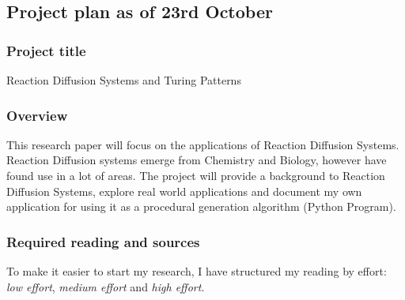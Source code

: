 \documentclass[a4paper, 11pt]{article}
\begin{document}
\subsection*{Project plan as of 23rd October}

\subsubsection*{Project title}
Reaction Diffusion Systems and Turing Patterns

\subsubsection*{Overview}
This research paper will focus on the applications of Reaction Diffusion Systems. Reaction Diffusion systems emerge from Chemistry and Biology, however have found use in a lot of areas. The project will provide a background to Reaction Diffusion Systems, explore real world applications and document my own application for using it as a procedural generation algorithm (Python Program).

\subsubsection*{Required reading and sources}
To make it easier to start my research, I have structured my reading by effort: \emph{low effort}, \emph{medium effort} and \emph{high effort}.
\end{document}
